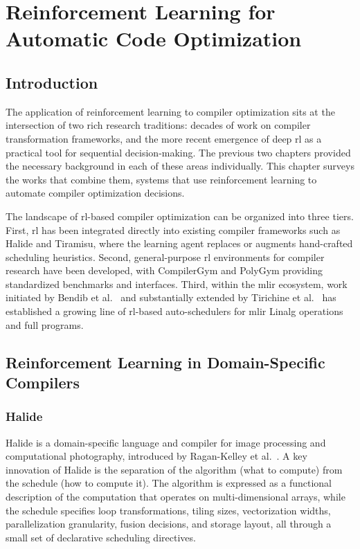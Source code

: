 \chapter{Reinforcement Learning for Automatic Code Optimization}
\label{ch:related-work}

\section{Introduction}

The application of reinforcement learning to compiler optimization sits at the intersection of two rich research traditions: decades of work on compiler transformation frameworks, and the more recent emergence of deep \gls{rl} as a practical tool for sequential decision-making. The previous two chapters provided the necessary background in each of these areas individually. This chapter surveys the works that combine them, systems that use reinforcement learning to automate compiler optimization decisions.

The landscape of \gls{rl}-based compiler optimization can be organized into three tiers. First, \gls{rl} has been integrated directly into existing compiler frameworks such as Halide and Tiramisu, where the learning agent replaces or augments hand-crafted scheduling heuristics. Second, general-purpose \gls{rl} environments for compiler research have been developed, with CompilerGym and PolyGym providing standardized benchmarks and interfaces. Third, within the \gls{mlir} ecosystem, work initiated by Bendib et al.~\cite{bendib2024reinforcement} and substantially extended by Tirichine et al.~\cite{tirichine2025reinforcement} has established a growing line of \gls{rl}-based auto-schedulers for \gls{mlir} Linalg operations and full programs.

\section{Reinforcement Learning in Domain-Specific Compilers}

\subsection{Halide}

Halide is a domain-specific language and compiler for image processing and computational photography, introduced by Ragan-Kelley et al.~\cite{ragan2013halide}. A key innovation of Halide is the separation of the algorithm (what to compute) from the schedule (how to compute it). The algorithm is expressed as a functional description of the computation that operates on multi-dimensional arrays, while the schedule specifies loop transformations, tiling sizes, vectorization widths, parallelization granularity, fusion decisions, and storage layout, all through a small set of declarative scheduling directives.

